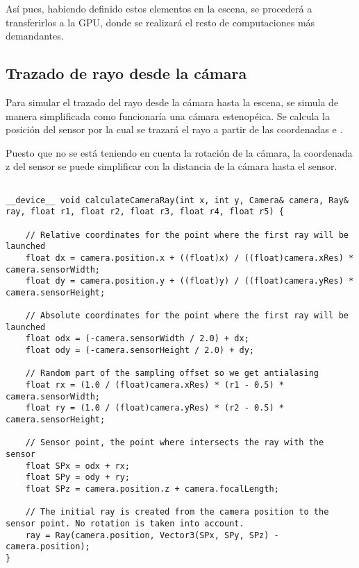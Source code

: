 Así pues, habiendo definido estos elementos en la escena, se procederá a transferirlos a la GPU, donde se realizará el resto de computaciones más demandantes. 


	\subsection{Trazado de rayo desde la cámara}

Para simular el trazado del rayo desde la cámara hasta la escena, se simula de manera simplificada como funcionaría una cámara estenopéica. Se calcula la posición del sensor por la cual se trazará el rayo a partir de las coordenadas  e . 

Puesto que no se está teniendo en cuenta la rotación de la cámara, la coordenada z del sensor se puede simplificar con la distancia de la cámara hasta el sensor.

\begin{lstlisting}
	
__device__ void calculateCameraRay(int x, int y, Camera& camera, Ray& ray, float r1, float r2, float r3, float r4, float r5) {

    // Relative coordinates for the point where the first ray will be launched
    float dx = camera.position.x + ((float)x) / ((float)camera.xRes) * camera.sensorWidth;
    float dy = camera.position.y + ((float)y) / ((float)camera.yRes) * camera.sensorHeight;

    // Absolute coordinates for the point where the first ray will be launched
    float odx = (-camera.sensorWidth / 2.0) + dx;
    float ody = (-camera.sensorHeight / 2.0) + dy;

    // Random part of the sampling offset so we get antialasing
    float rx = (1.0 / (float)camera.xRes) * (r1 - 0.5) * camera.sensorWidth;
    float ry = (1.0 / (float)camera.yRes) * (r2 - 0.5) * camera.sensorHeight;

    // Sensor point, the point where intersects the ray with the sensor
    float SPx = odx + rx;
    float SPy = ody + ry;
    float SPz = camera.position.z + camera.focalLength;

    // The initial ray is created from the camera position to the sensor point. No rotation is taken into account.
    ray = Ray(camera.position, Vector3(SPx, SPy, SPz) - camera.position);
}

\end{lstlisting}





	










